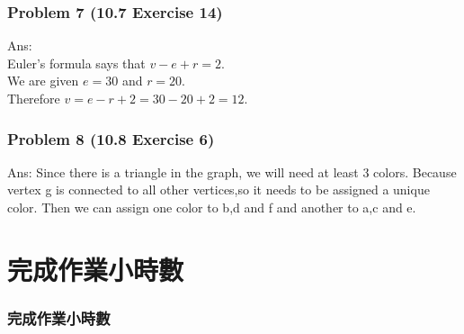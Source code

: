 \documentclass[12pt,hyperref={bookmarks=false}]{beamer}
\begin{document}
	\begin{frame}
	\frametitle{Problem 7 (10.7 Exercise 14)}
	\fontsize{12}{16pt}\selectfont

	\vspace*{0.3cm}
	Ans: \\
	\vspace*{0.3cm}
	Euler's formula says that $v - e + r = 2$.\\
	We are given $e = 30$ and $r = 20$. \\
	Therefore $v = e - r +2  = 30 − 20 + 2 = 12$.
	\end{frame}

	\begin{frame}
	\frametitle{Problem 8 (10.8 Exercise 6)}
	\fontsize{12}{16pt}\selectfont
	Ans: Since there is a triangle in the graph, we will need at least 3 colors.
	Because vertex g is connected to all other vertices,so it needs to be assigned a unique color. 
	Then we can assign one color to b,d and f and another to a,c and e. 
	\end{frame}	


		
\section{完成作業小時數}

\begin{frame}
\frametitle{完成作業小時數}
\centerline{\fontsize{16}{16pt}}	
\end{frame}

\end{document}
